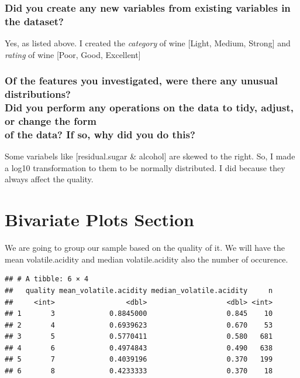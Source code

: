 \documentclass[]{article}
\begin{document}
\subsubsection{Did you create any new variables from existing variables
in the
dataset?}\label{did-you-create-any-new-variables-from-existing-variables-in-the-dataset}

Yes, as listed above. I created the \emph{category} of wine {[}Light,
Medium, Strong{]} and \emph{rating} of wine {[}Poor, Good, Excellent{]}

\subsubsection{\texorpdfstring{Of the features you investigated, were
there any unusual distributions?\\
Did you perform any operations on the data to tidy, adjust, or change
the form\\
of the data? If so, why did you do
this?}{Of the features you investigated, were there any unusual distributions? Did you perform any operations on the data to tidy, adjust, or change the form of the data? If so, why did you do this?}}\label{of-the-features-you-investigated-were-there-any-unusual-distributions-did-you-perform-any-operations-on-the-data-to-tidy-adjust-or-change-the-form-of-the-data-if-so-why-did-you-do-this}

Some variabels like {[}residual.sugar \& alcohol{]} are skewed to the
right. So, I made a log10 transformation to them to be normally
distributed. I did because they always affect the quality.

\section{Bivariate Plots Section}\label{bivariate-plots-section}

We are going to group our sample based on the quality of it. We will
have the mean volatile.acidity and median volatile.acidity also the
number of occurence.

\begin{verbatim}
## # A tibble: 6 × 4
##   quality mean_volatile.acidity median_volatile.acidity     n
##     <int>                 <dbl>                   <dbl> <int>
## 1       3             0.8845000                   0.845    10
## 2       4             0.6939623                   0.670    53
## 3       5             0.5770411                   0.580   681
## 4       6             0.4974843                   0.490   638
## 5       7             0.4039196                   0.370   199
## 6       8             0.4233333                   0.370    18
\end{verbatim}
\end{document}
